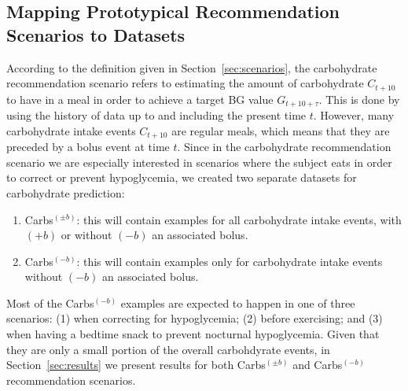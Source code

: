 \documentclass[journal,article,submit,moreauthors,pdftex]{Definitions/mdpi}
\begin{document}
\subsection{Mapping Prototypical Recommendation Scenarios to Datasets}
\label{sec:mapping}

According to the definition given in Section~\ref{sec:scenarios}, the carbohydrate recommendation scenario refers to estimating the amount of carbohydrate $C_{t+10}$ to have in a meal in order to achieve a target BG value $G_{t+10+\tau}$. This is done by using the history of data up to and including the present time $t$. However, many carbohydrate intake events $C_{t+10}$ are regular meals, which means that they are preceded by a bolus event at time $t$. Since in the carbohydrate recommendation scenario we are especially interested in scenarios where the subject eats in order to correct or prevent hypoglycemia, we created two separate datasets for carbohydrate prediction:
\begin{enumerate}
    \item Carbs$^{(\pm b)}$: this will contain examples for all carbohydrate intake events, with $(+b)$ or without $(-b)$ an associated bolus.
    \item Carbs$^{(-b)}$: this will contain examples only for carbohydrate intake events without $(-b)$ an associated bolus.
\end{enumerate}
Most of the Carbs$^{(-b)}$ examples are expected to happen in one of three scenarios: (1) when correcting for hypoglycemia; (2) before exercising; and (3) when having a bedtime snack to prevent nocturnal hypoglycemia. Given that they are only a small portion of the overall carbohdyrate events, in Section~\ref{sec:results} we present results for both Carbs$^{(\pm b)}$ and Carbs$^{(-b)}$ recommendation scenarios.
\end{document}
